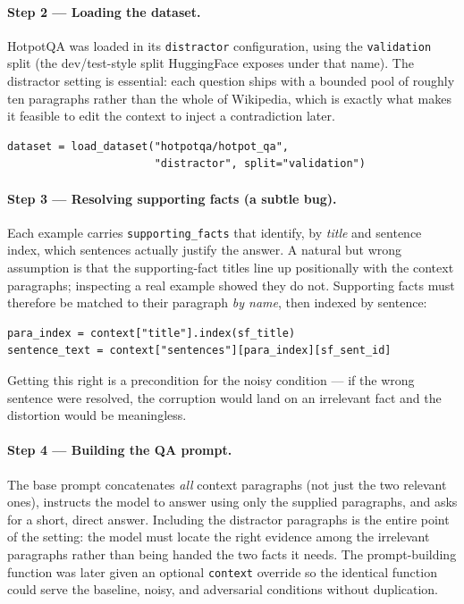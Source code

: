 \documentclass[11pt,a4paper]{article}
\begin{document}
\paragraph{Step 2 --- Loading the dataset.}
HotpotQA was loaded in its \texttt{distractor} configuration, using the
\texttt{validation} split (the dev/test-style split HuggingFace exposes
under that name). The distractor setting is essential: each question
ships with a bounded pool of roughly ten paragraphs rather than the
whole of Wikipedia, which is exactly what makes it feasible to edit the
context to inject a contradiction later.

\begin{lstlisting}
dataset = load_dataset("hotpotqa/hotpot_qa",
                       "distractor", split="validation")
\end{lstlisting}

\paragraph{Step 3 --- Resolving supporting facts (a subtle bug).}
Each example carries \texttt{supporting\_facts} that identify, by
\emph{title} and sentence index, which sentences actually justify the
answer. A natural but wrong assumption is that the supporting-fact
titles line up positionally with the context paragraphs; inspecting a
real example showed they do not. Supporting facts must therefore be
matched to their paragraph \emph{by name}, then indexed by sentence:

\begin{lstlisting}
para_index = context["title"].index(sf_title)
sentence_text = context["sentences"][para_index][sf_sent_id]
\end{lstlisting}

Getting this right is a precondition for the noisy condition --- if the
wrong sentence were resolved, the corruption would land on an
irrelevant fact and the distortion would be meaningless.

\paragraph{Step 4 --- Building the QA prompt.}
The base prompt concatenates \emph{all} context paragraphs (not just
the two relevant ones), instructs the model to answer using only the
supplied paragraphs, and asks for a short, direct answer. Including the
distractor paragraphs is the entire point of the setting: the model
must locate the right evidence among the irrelevant paragraphs rather
than being handed the two facts it needs. The prompt-building function
was later given an optional \texttt{context} override so the identical
function could serve the baseline, noisy, and adversarial conditions
without duplication.
\end{document}
